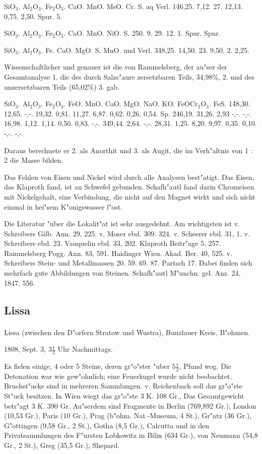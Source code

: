 \documentclass[a4paper, 11pt, oneside]{article}
\begin{document}
SiO$_{3}$. Al$_{2}$O$_{3}$. Fe$_{2}$O$_{3}$. CaO. MnO. MsO. Cr. S. aq Verl.  
1\. 46,25. 7,12. 27. 12,13. 0,75. 2,50. Spur. 5.  

SiO$_{3}$. Al$_{2}$O$_{3}$. Fe$_{2}$O$_{3}$. CaO. MnO. NiO. S.  
2\. 50. 9. 29. 12. 1. Spur. Spur.  

SiO$_{3}$. Al$_{2}$O$_{3}$. Fe. CaO. MgO. S. MnO. und Verl.  
3\. 48,25. 14,50. 23. 9,50. 2. 2,25.

Wissenschaftlicher und genauer ist die von Rammelsberg, der au"ser der Gesamtanalyse 1. die des durch Salzs"aure zersetzbaren Teils, 34,98\%, 2. und des unzersetzbaren Teils (65,02\%) 3. gab.

SiO$_{3}$. Al$_{2}$O$_{3}$. Fe$_{2}$O$_{3}$. FeO. MnO. CaO. MgO. NaO. KO. FeOCr$_{2}$O$_{3}$. FeS.  
1\. 48,30. 12,65. -,-. 19,32. 0,81. 11,27. 6,87. 0,62. 0,26. 0,54. Sp.  
2\. 46,19. 31,26. 2,93 -,-. -,-. 16,98. 1,12. 1,14. 0,50. 0,83. -,-.  
3\. 49,44. 2,64. -,-. 28,31. 1,25. 8,20. 9,97. 0,35. 0,10. -,-. -,-.

Daraus berechnete er 2. als Anorthit und 3. als Augit, die im Verh"altnis von 1 : 2 die Masse bilden.

Das Fehlen von Eisen und Nickel wird durch alle Analysen best"atigt. Das Eisen, das Klaproth fand, ist an Schwefel gebunden. Schafh"autl fand darin Chromeisen mit Nickelgehalt, eine Verbindung, die nicht auf den Magnet wirkt und sich nicht einmal in hei"sem K"onigswasser l"ost.

Die Literatur "uber die Lokalit"at ist sehr ausgedehnt. Am wichtigsten ist v. Schreibers Gilb. Ann. 29, 225. v. Moser ebd. 309. 324. v. Scheerer ebd. 31, 1. v. Schreibers ebd. 23. Vauquelin ebd. 33, 202. Klaproth Beitr"age 5, 257. Rammelsberg Pogg. Ann. 83, 591. Haidinger Wien. Akad. Ber. 40, 525. v. Schreibers Stein- und Metallmassen 20. 59. 69. 87. Partsch 17. Dabei finden sich mehrfach gute Abbildungen von Steinen. Schafh"autl M"unchn. gel. Anz. 24, 1847, 556.

\subsection{Lissa}
\normalsize
\paragraph{}
Lissa (zwischen den D"orfern Stratow und Wustra), Bunzlauer Kreis, B"ohmen.

1808, Sept. 3, $3\frac{1}{2}$ Uhr Nachmittags.

Es fielen einige, 4 oder 5 Steine, deren gr"o"ster "uber $5\frac{1}{2}$, Pfund wog. Die Detonation war wie gew"ohnlich; eine Feuerkugel wurde nicht beobachtet. Bruchst"ucke sind in mehreren Sammlungen. v. Reichenbach soll das gr"o"ste St"uck besitzen. In Wien wiegt das gr"o"ste 3 K. 108 Gr., Das Gesamtgewicht betr"agt 3 K. 390 Gr. Au"serdem sind Fragmente in Berlin (769,892 Gr.), London (10,53 Gr.), Paris (10 Gr.), Prag (b"ohm. Nat.-Museum, 4 St.), Gr"atz (36 Gr.), G"ottingen (9,58 Gr., 2 St.), Gotha (8,5 Gr.), Calcutta und in den Privatsammlungen des F"ursten Lobkowitz in Bilin (634 Gr.), von Neumann (54,8 Gr., 2 St.), Greg (35,5 Gr.), Shepard.
\end{document}
